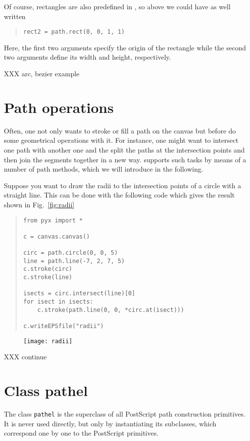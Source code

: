 Of course, rectangles are also predefined in \PyX{}, so above we could
have as well written
\begin{quote}
\begin{verbatim}
rect2 = path.rect(0, 0, 1, 1)
\end{verbatim}
\end{quote}
Here, the first two arguments specify the origin of the rectangle
while the second two arguments define its width and height,
respectively.

XXX arc, bezier example

\section{Path operations}

Often, one not only wants to stroke or fill a path on the canvas
but before do some geometrical operations with it. For instance, one
might want to intersect one path with another one and the split the
paths at the intersection points and then join the segments together
in a new way. \PyX{} supports such tasks by means of a number
of path methods, which we will introduce in the following.

Suppose you want to draw the radii to the intersection points of a
circle with a straight line. This can be done with the following code
which gives the result shown in Fig.~\ref{fig:radii}
\begin{quote}
\begin{verbatim}
from pyx import *

c = canvas.canvas()

circ = path.circle(0, 0, 5)
line = path.line(-7, 2, 7, 5)
c.stroke(circ)
c.stroke(line)

isects = circ.intersect(line)[0]
for isect in isects:
    c.stroke(path.line(0, 0, *circ.at(isect)))

c.writeEPSfile("radii")
\end{verbatim}
\end{quote}
\begin{figure}
\centerline{\texttt{[image: radii]}}
\label{fig:rects}
\end{figure}

XXX continue


\section{Class pathel}

The class \verb|pathel| is the superclass of all PostScript path
construction primitives. It is never used directly, but only by
instantiating its subclasses, which correspond one by one to the
PostScript primitives.

